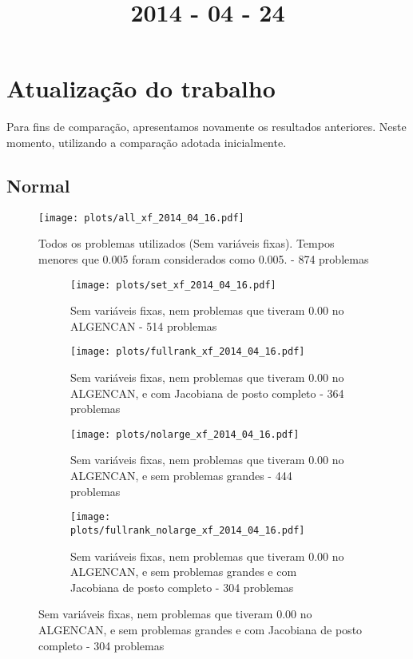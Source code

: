 \documentclass{article}
\title{2014 - 04 - 24}
\author{}
\date{}
\begin{document}
\maketitle
\section{Atualização do trabalho}

Para fins de comparação, apresentamos novamente os resultados anteriores. Neste
momento, utilizando a comparação adotada inicialmente.

\subsection{Normal}

\begin{figure}[H]
  \centering
  \texttt{[image: plots/all\_xf\_2014\_04\_16.pdf]}
  \caption{Todos os problemas utilizados (Sem variáveis fixas). Tempos menores
    que 0.005 foram considerados como 0.005. - 874 problemas}
\end{figure}
\begin{figure}[H]
  \centering
  \begin{subfigure}{0.48\textwidth}
    \texttt{[image: plots/set\_xf\_2014\_04\_16.pdf]}
    \caption{Sem variáveis fixas, nem problemas
      que tiveram 0.00 no ALGENCAN - 514 problemas}
  \end{subfigure}
  \begin{subfigure}{0.48\textwidth}
    \texttt{[image: plots/fullrank\_xf\_2014\_04\_16.pdf]}
    \caption{Sem variáveis fixas, nem problemas
      que tiveram 0.00 no ALGENCAN, e com Jacobiana de posto completo - 364
      problemas}
  \end{subfigure}
  \begin{subfigure}{0.48\textwidth}
    \texttt{[image: plots/nolarge\_xf\_2014\_04\_16.pdf]}
    \caption{Sem variáveis fixas, nem problemas
      que tiveram 0.00 no ALGENCAN, e sem problemas grandes - 444 problemas}
  \end{subfigure}
  \begin{subfigure}{0.48\textwidth}
    \texttt{[image: plots/fullrank\_nolarge\_xf\_2014\_04\_16.pdf]}
    \caption{Sem variáveis fixas, nem problemas
      que tiveram 0.00 no ALGENCAN, e sem problemas grandes e com Jacobiana de
      posto completo - 304 problemas}
  \end{subfigure}
\end{figure}
\end{document}
